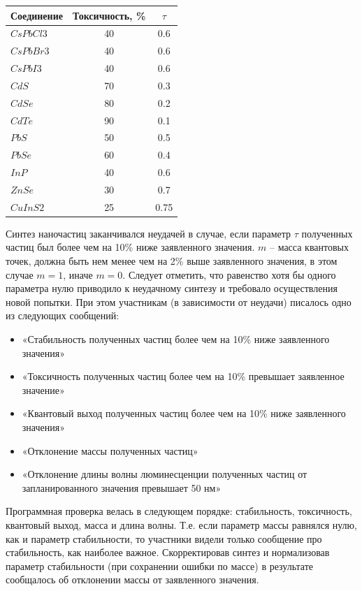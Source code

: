 \begin{table}[H]
	\begin{center}
		\begin{tabular}{|l|c|c|}
			\hline
			Соединение	&Токсичность, \% &$\tau$ \\
			\hline
			$CsPbCl3$	&40&0.6 \\
			\hline
			$CsPbBr3$	&40&	0.6 \\
			\hline
			$CsPbI3$	&40	&0.6 \\
			\hline
			$CdS$	&70	&0.3 \\
			\hline
			$CdSe$	&80	&0.2 \\
			\hline
			$CdTe$	&90	&0.1 \\
			\hline
			$PbS$	&50&	0.5 \\
			\hline
			$PbSe$	&60&	0.4 \\
			\hline
			$InP$	&40	&0.6 \\
			\hline
			$ZnSe$&	30&	0.7 \\
			\hline
			$CuInS2$&	25	&0.75 \\
			\hline
		\end{tabular}
	\end{center}
\end{table}

Синтез наночастиц заканчивался неудачей в случае, если параметр $\tau$ полученных частиц был более чем на 10\% ниже заявленного значения. $m$ – масса квантовых точек, должна быть нем менее чем на 2\% выше заявленного значения, в этом случае $m = 1$, иначе $m = 0$. Следует отметить, что равенство хотя бы одного параметра нулю приводило к неудачному синтезу и требовало осуществления новой попытки. При этом участникам (в зависимости от неудачи) писалось одно из следующих сообщений:

\begin{itemize}
	\item «Стабильность полученных частиц более чем на 10\% ниже заявленного значения»
	\item «Токсичность полученных частиц более чем на 10\% превышает заявленное значение»
	\item «Квантовый выход полученных частиц более чем на 10\% ниже заявленного значения»
	\item «Отклонение массы полученных частиц»
	\item «Отклонение длины волны люминесценции полученных частиц от запланированного значения превышает 50 нм»
\end{itemize}

Программная проверка велась в следующем порядке: стабильность, токсичность, квантовый выход, масса и длина волны. Т.е. если параметр массы равнялся нулю, как и параметр стабильности, то участники видели только сообщение про стабильность, как наиболее важное. Скорректировав синтез и нормализовав параметр стабильности (при сохранении ошибки по массе) в результате сообщалось об отклонении массы от заявленного значения.

